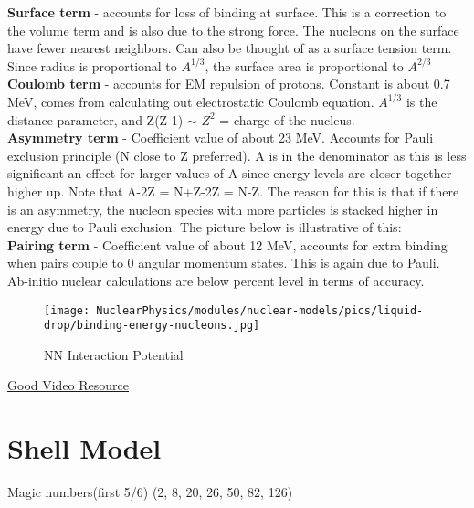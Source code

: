                 \indent \indent \textbf{Surface term} - accounts for loss of binding at surface. This is a correction to the volume term and is also due to the strong force. The nucleons on the surface have fewer nearest neighbors. Can also be thought of as a surface tension term. Since radius is proportional to $A^{1/3}$, the surface area is proportional to $A^{2/3}$\\
                
                \indent \indent \textbf{Coulomb term} - accounts for EM repulsion of protons. Constant is about 0.7 MeV, comes from calculating out electrostatic Coulomb equation. $A^{1/3}$ is the distance parameter, and Z(Z-1) $\sim$ $Z^2$ = charge of the nucleus. \\
                
                \indent \indent \textbf{Asymmetry term} - Coefficient value of about 23 MeV. Accounts for Pauli exclusion principle (N close to Z preferred). A is in the denominator as this is less significant an effect for larger values of A since energy levels are closer together higher up. Note that A-2Z = N+Z-2Z = N-Z. The reason for this is that if there is an asymmetry, the nucleon species with more particles is stacked higher in energy due to Pauli exclusion. The picture below is illustrative of this:\\
                
                \indent \indent \textbf{Pairing term} - Coefficient value of about 12 MeV, accounts for extra binding when pairs couple to 0 angular momentum states. This is again due to Pauli.\\
            
            Ab-initio nuclear calculations are below percent level in terms of accuracy. 
            
        \begin{figure}[H]
        \centering
        \texttt{[image: NuclearPhysics/modules/nuclear-models/pics/liquid-drop/binding-energy-nucleons.jpg]}
        \caption{NN Interaction Potential}
    \end{figure}
            
            \href{https://www.youtube.com/watch?v=oJaq8g8nFZU&t=1s}{Good Video Resource}
    \section{Shell Model}
    
        
Magic numbers(first 5/6)
(2, 8, 20, 26, 50, 82, 126)



